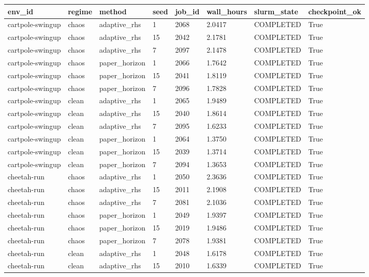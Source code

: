 \begin{tabular}{llllllll}
\toprule
env\_id & regime & method & seed & job\_id & wall\_hours & slurm\_state & checkpoint\_ok \\
\midrule
cartpole-swingup & chaos & adaptive\_rhs & 1 & 2068 & 2.0417 & COMPLETED & True \\
cartpole-swingup & chaos & adaptive\_rhs & 15 & 2042 & 2.1781 & COMPLETED & True \\
cartpole-swingup & chaos & adaptive\_rhs & 7 & 2097 & 2.1478 & COMPLETED & True \\
cartpole-swingup & chaos & paper\_horizon & 1 & 2066 & 1.7642 & COMPLETED & True \\
cartpole-swingup & chaos & paper\_horizon & 15 & 2041 & 1.8119 & COMPLETED & True \\
cartpole-swingup & chaos & paper\_horizon & 7 & 2096 & 1.7828 & COMPLETED & True \\
cartpole-swingup & clean & adaptive\_rhs & 1 & 2065 & 1.9489 & COMPLETED & True \\
cartpole-swingup & clean & adaptive\_rhs & 15 & 2040 & 1.8614 & COMPLETED & True \\
cartpole-swingup & clean & adaptive\_rhs & 7 & 2095 & 1.6233 & COMPLETED & True \\
cartpole-swingup & clean & paper\_horizon & 1 & 2064 & 1.3750 & COMPLETED & True \\
cartpole-swingup & clean & paper\_horizon & 15 & 2039 & 1.3714 & COMPLETED & True \\
cartpole-swingup & clean & paper\_horizon & 7 & 2094 & 1.3653 & COMPLETED & True \\
cheetah-run & chaos & adaptive\_rhs & 1 & 2050 & 2.3636 & COMPLETED & True \\
cheetah-run & chaos & adaptive\_rhs & 15 & 2011 & 2.1908 & COMPLETED & True \\
cheetah-run & chaos & adaptive\_rhs & 7 & 2081 & 2.1036 & COMPLETED & True \\
cheetah-run & chaos & paper\_horizon & 1 & 2049 & 1.9397 & COMPLETED & True \\
cheetah-run & chaos & paper\_horizon & 15 & 2019 & 1.9486 & COMPLETED & True \\
cheetah-run & chaos & paper\_horizon & 7 & 2078 & 1.9381 & COMPLETED & True \\
cheetah-run & clean & adaptive\_rhs & 1 & 2048 & 1.6178 & COMPLETED & True \\
cheetah-run & clean & adaptive\_rhs & 15 & 2010 & 1.6339 & COMPLETED & True \\

\end{tabular}

